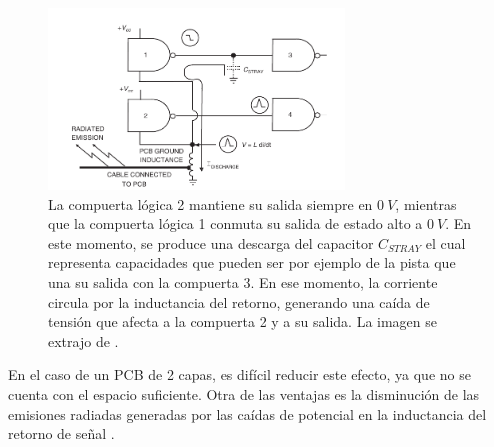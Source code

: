 
\begin{figure}[htb]
    \centering
    \includegraphics[width=0.7\textwidth]{img/ground_bounce.png}
    \caption{La compuerta lógica 2 mantiene su salida siempre en $0 \ V$, mientras que la compuerta lógica 1 conmuta su salida de estado alto a $0 \ V$. En este momento, se produce una descarga del capacitor $C_{STRAY}$ el cual representa capacidades que pueden ser por ejemplo de la pista que una su salida con la compuerta 3. En ese momento, la corriente circula por la inductancia del retorno, generando una caída de tensión que afecta a la compuerta 2 y a su salida. La imagen se extrajo de \cite[p.~381]{ott2011electromagnetic}.}
    \label{fig:ground_bounce}
\end{figure}

En el caso de un PCB de 2 capas, es difícil reducir este efecto, ya que no se cuenta con el espacio suficiente. Otra de las ventajas es la disminución de las emisiones radiadas generadas por las caídas de potencial en la inductancia del retorno de señal \cite[p.~477]{ott2011electromagnetic}.







